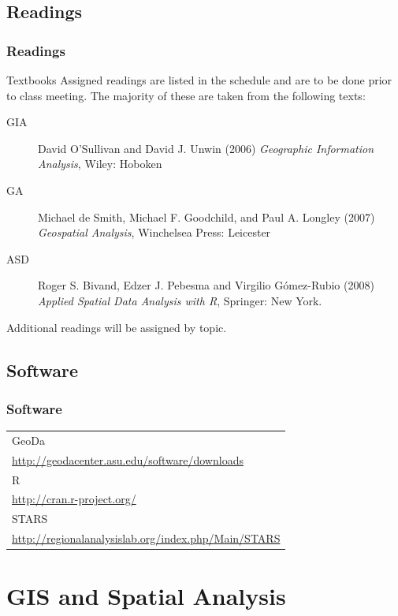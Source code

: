 \documentclass[nototal]{beamer}
\begin{document}
\subsection{Readings} 

\begin{frame}
\frametitle{Readings}
\begin{block}{Textbooks}
Assigned readings are listed in the schedule and are to be
done prior to class meeting. The majority of these are taken from the
following texts:
\begin{description}
  \item[GIA] David O'Sullivan and
David J. Unwin (2006) \emph{Geographic Information Analysis}, Wiley: Hoboken
  \item[GA] 
Michael de Smith, Michael F. Goodchild, and Paul A. Longley (2007) \emph{Geospatial
Analysis}, Winchelsea Press: Leicester\\
\item[ASD] Roger S. Bivand, Edzer J. Pebesma and Virgilio G\'omez-Rubio (2008)
  \emph{Applied Spatial Data Analysis with R}, Springer: New York.
\end{description}

Additional readings will be assigned by topic.


\end{block}

\end{frame}

\subsection{Software} 

\begin{frame}
	\frametitle{Software}
  \centering
 \begin{tabular}{l}
  GeoDa\\
    \url{http://geodacenter.asu.edu/software/downloads}
    \\ \hline
   R\\
    \url{http://cran.r-project.org/}
    \\
    \hline
   STARS
   \\
    \url{http://regionalanalysislab.org/index.php/Main/STARS}	
    \\
    \hline
 \end{tabular}
 \end{frame} 


\section{GIS and Spatial Analysis} 
\end{document}
